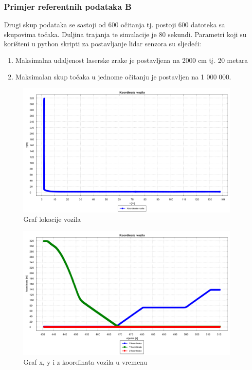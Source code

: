 \subsubsection{Primjer referentnih podataka B}
Drugi skup podataka se sastoji od 600 očitanja tj. postoji 600 datoteka sa skupovima točaka. Duljina trajanja te simulacije je 80 sekundi. Parametri koji su korišteni u python skripti za postavljanje lidar senzora su sljedeći:
\begin{enumerate}
  \item Maksimalna udaljenost laserske zrake je postavljena na 2000 cm tj. 20 metara
  \item Maksimalan skup točaka u jednome očitanju je postavljen na 1 000 000.
\end{enumerate}
\begin{figure}[H]
  \includegraphics[scale=0.35]{images/koordinate2.png}
  \caption{Graf lokacije vozila}
  \label{fig:gt2_lokacija}
\end{figure}
\begin{figure}[H]
  \includegraphics[scale=0.35]{images/koordinate_vrijeme2.png}
  \caption{Graf x, y i z koordinata vozila u vremenu}
  \label{fig:gt2_lokacija_koord}
\end{figure}
